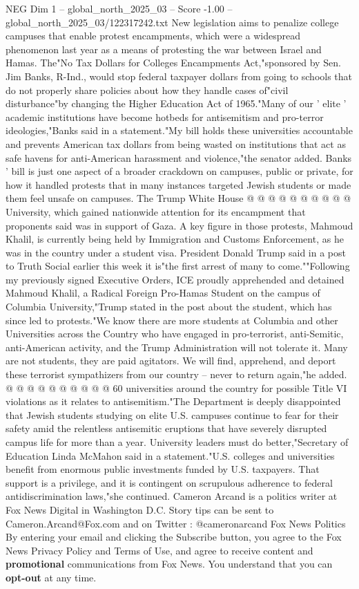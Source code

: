 \begin{textsample}{NEG Dim 1 – global\_north\_2025\_03 – Score -1.00 – global\_north\_2025\_03/122317242.txt}  \label{ex:f1_neg_049}
New legislation aims to penalize college campuses that enable protest encampments, which were a widespread phenomenon last year as a means of protesting the war between Israel and Hamas.
The"No Tax Dollars for Colleges Encampments Act,"sponsored by Sen.
Jim Banks, R-Ind., would stop federal taxpayer dollars from going to schools that do not properly share policies about how they handle cases of"civil disturbance"by changing the Higher Education Act of 1965."Many of our ' elite ' academic institutions have become hotbeds for antisemitism and pro-terror ideologies,"Banks said in a statement."My bill holds these universities accountable and prevents American tax dollars from being wasted on institutions that act as safe havens for anti-American harassment and violence,"the senator added.
Banks ' bill is just one aspect of a broader crackdown on campuses, public or private, for how it handled protests that in many instances targeted Jewish students or made them feel unsafe on campuses.
The Trump White House @ @ @ @ @ @ @ @ @ @ University, which gained nationwide attention for its encampment that proponents said was in support of Gaza.
A key figure in those protests, Mahmoud Khalil, is currently being held by Immigration and Customs Enforcement, as he was in the country under a student visa.
President Donald Trump said in a post to Truth Social earlier this week it is"the first arrest of many to come.""Following my previously signed Executive Orders, ICE proudly apprehended and detained Mahmoud Khalil, a Radical Foreign Pro-Hamas Student on the campus of Columbia University,"Trump stated in the post about the student, which has since led to protests."We know there are more students at Columbia and other Universities across the Country who have engaged in pro-terrorist, anti-Semitic, anti-American activity, and the Trump Administration will not tolerate it.
Many are not students, they are paid agitators.
We will find, apprehend, and deport these terrorist sympathizers from our country -- never to return again,"he added. @ @ @ @ @ @ @ @ @ @ 60 universities around the country for possible Title VI violations as it relates to antisemitism."The Department is deeply disappointed that Jewish students studying on elite U.S. campuses continue to fear for their safety amid the relentless antisemitic eruptions that have severely disrupted campus life for more than a year.
University leaders must do better,"Secretary of Education Linda McMahon said in a statement."U.S. colleges and universities benefit from enormous public investments funded by U.S. taxpayers.
That support is a privilege, and it is contingent on scrupulous adherence to federal antidiscrimination laws,"she continued.
Cameron Arcand is a politics writer at Fox News Digital in Washington D.C.
Story tips can be sent to Cameron.Arcand@Fox.com and on Twitter : @cameronarcand Fox News Politics By entering your email and clicking the Subscribe button, you agree to the Fox News Privacy Policy and Terms of Use, and agree to receive content and \textbf{promotional} communications from Fox News.
You understand that you can \textbf{opt-out} at any time.

\end{textsample}
